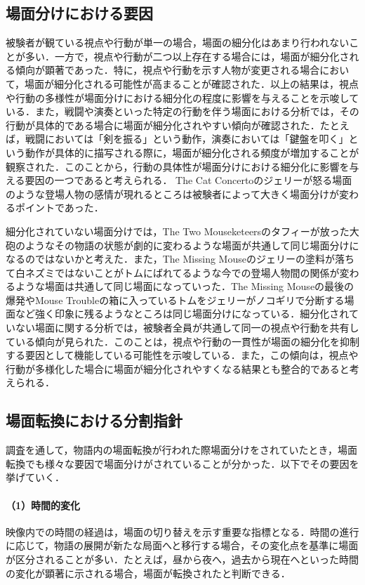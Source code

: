 \subsection{場面分けにおける要因}
被験者が観ている視点や行動が単一の場合，場面の細分化はあまり行われないことが多い．一方で，視点や行動が二つ以上存在する場合には，場面が細分化される傾向が顕著であった．特に，視点や行動を示す人物が変更される場合において，場面が細分化される可能性が高まることが確認された．以上の結果は，視点や行動の多様性が場面分けにおける細分化の程度に影響を与えることを示唆している．また，戦闘や演奏といった特定の行動を伴う場面における分析では，その行動が具体的である場合に場面が細分化されやすい傾向が確認された．たとえば，戦闘においては「剣を振る」という動作，演奏においては「鍵盤を叩く」という動作が具体的に描写される際に，場面が細分化される頻度が増加することが観察された．このことから，行動の具体性が場面分けにおける細分化に影響を与える要因の一つであると考えられる． The Cat Concertoのジェリーが怒る場面のような登場人物の感情が現れるところは被験者によって大きく場面分けが変わるポイントであった．

細分化されていない場面分けでは，The Two Mouseketeersのタフィーが放った大砲のようなその物語の状態が劇的に変わるような場面が共通して同じ場面分けになるのではないかと考えた．また，The Missing Mouseのジェリーの塗料が落ちて白ネズミではないことがトムにばれてるような今での登場人物間の関係が変わるような場面は共通して同じ場面になっていった．The Missing Mouseの最後の爆発やMouse Troubleの箱に入っているトムをジェリーがノコギリで分断する場面など強く印象に残るようなところは同じ場面分けになっている．細分化されていない場面に関する分析では，被験者全員が共通して同一の視点や行動を共有している傾向が見られた．このことは，視点や行動の一貫性が場面の細分化を抑制する要因として機能している可能性を示唆している．また，この傾向は，視点や行動が多様化した場合に場面が細分化されやすくなる結果とも整合的であると考えられる．



\subsection{場面転換における分割指針}
調査を通して，物語内の場面転換が行われた際場面分けをされていたとき，場面転換でも様々な要因で場面分けがされていることが分かった．以下でその要因を挙げていく．

\paragraph*{（1）時間的変化}
映像内での時間の経過は，場面の切り替えを示す重要な指標となる．時間の進行に応じて，物語の展開が新たな局面へと移行する場合，その変化点を基準に場面が区分されることが多い．たとえば，昼から夜へ，過去から現在へといった時間の変化が顕著に示される場合，場面が転換されたと判断できる．

